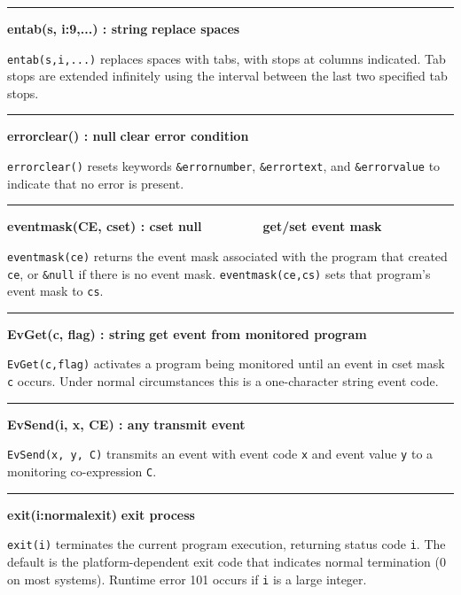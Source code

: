 \bigskip\hrule\vspace{0.1cm}
\noindent
{\bf entab(s, i:9,...) : string } \hfill {\bf replace spaces}

\noindent
\texttt{entab(s,i,...)} replaces spaces with tabs, with stops at columns
indicated. Tab stops are extended infinitely using the interval between
the last two specified tab stops.

\bigskip\hrule\vspace{0.1cm}
\noindent
{\bf errorclear() : null } \hfill {\bf clear error condition}

\noindent
{}\texttt{errorclear()} resets keywords
\texttt{\&errornumber}, \texttt{\&errortext}, and
\texttt{\&errorvalue} to indicate that no error is present.

\bigskip\hrule\vspace{0.1cm}
\noindent
{\bf eventmask(CE, cset) : cset {\textbar} null } \hfill {\bf \ \ \ \ \ \ \ \  get/set event mask}

\noindent
{}\texttt{eventmask(ce)} returns the event mask associated
with the program that created \texttt{ce}, or \texttt{\&null} if there
is no event mask. \texttt{eventmask(ce,cs)} sets that program's event
mask to \texttt{cs}.

\bigskip\hrule\vspace{0.1cm}
\noindent
{\bf EvGet(c, flag) : string } \hfill {\bf get event from monitored program}

\noindent
\texttt{EvGet(c,flag)} activates a program being monitored until an event
in cset mask \texttt{c} occurs. Under normal circumstances this is a
one-character string event code.

\bigskip\hrule\vspace{0.1cm}
\noindent
{\bf EvSend(i, x, CE) : any } \hfill {\bf transmit event}

\noindent
{}\texttt{EvSend(x, y, C)} transmits an event with event
code \texttt{x} and event value \texttt{y} to a monitoring
co-expression \texttt{C}.

\bigskip\hrule\vspace{0.1cm}
\noindent
{\bf exit(i:normalexit) } \hfill {\bf exit process}

\noindent
{}\texttt{exit(i)} terminates the current program execution,
returning status code \texttt{i}. The default is the platform-dependent exit
code that indicates normal termination (0 on most systems).
Runtime error 101 occurs if \texttt{i} is a large integer.

